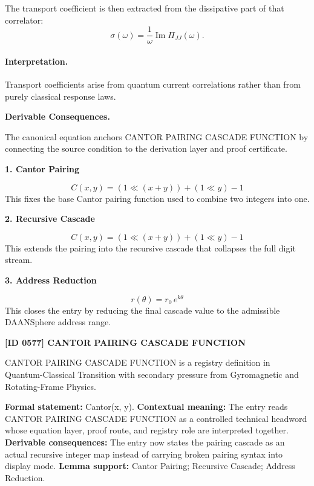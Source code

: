 The transport coefficient is then extracted from the dissipative part of that correlator:
\begin{equation}
\boxed{
\sigma(\omega)
=
\frac{1}{\omega}
\operatorname{Im}\Pi_{JJ}(\omega).
}
\end{equation}

\paragraph{Interpretation.}
Transport coefficients arise from quantum current correlations rather than from purely classical response laws.

\par\vspace{0.35em}
\noindent\textbf{Derivable Consequences.}\quad
\begingroup
\footnotesize
\raggedright
The canonical equation anchors CANTOR PAIRING CASCADE FUNCTION by connecting the source condition to the derivation layer and proof certificate.
\par\endgroup

\noindent\textbf{1. Cantor Pairing}\par
\[
C(x,y) = (1 \ll (x+y)) + (1 \ll y) - 1
\]
\noindent This fixes the base Cantor pairing function used to combine two integers into one.\par
\noindent\textbf{2. Recursive Cascade}\par
\[
C(x,y) = (1 \ll (x+y)) + (1 \ll y) - 1
\]
\noindent This extends the pairing into the recursive cascade that collapses the full digit stream.\par
\noindent\textbf{3. Address Reduction}\par
\[
r(\theta)=r_0\,e^{k\theta}
\]
\noindent This closes the entry by reducing the final cascade value to the admissible DAANSphere address range.\par

\clearpage
\noindent\textbf{[ID 0577] CANTOR PAIRING CASCADE FUNCTION}\par
\vspace{0.35em}
\begingroup\small
{}
CANTOR PAIRING CASCADE FUNCTION is a registry definition in Quantum-Classical Transition with secondary pressure from Gyromagnetic and Rotating-Frame Physics.

\begingroup\footnotesize\setlength{\emergencystretch}{3em}\sloppy
\textbf{Formal statement:} Cantor(x, y). \textbf{Contextual meaning:} The entry reads CANTOR PAIRING CASCADE FUNCTION as a controlled technical headword whose equation layer, proof route, and registry role are interpreted together. \textbf{Derivable consequences:} The entry now states the pairing cascade as an actual recursive integer map instead of carrying broken pairing syntax into display mode. \textbf{Lemma support:} Cantor Pairing; Recursive Cascade; Address Reduction.\par
\endgroup

